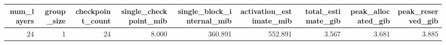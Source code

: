 \begin{tabular}{rrrrrrrrr}
\toprule
num\_layers & group\_size & checkpoint\_count & single\_checkpoint\_mib & single\_block\_internal\_mib & activation\_estimate\_mib & total\_estimate\_gib & peak\_allocated\_gib & peak\_reserved\_gib \\
\midrule
24 & 1 & 24 & 8.000 & 360.891 & 552.891 & 3.567 & 3.681 & 3.885 \\
\bottomrule
\end{tabular}
